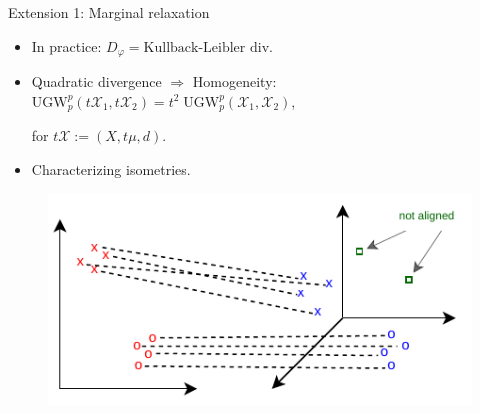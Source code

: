 \documentclass{beamer}
\newcommand{\ugw}{\text{UGW}}
\newcommand{\cX}{\mathcal X}
\begin{document}
\begin{frame}{Extension 1: Marginal relaxation}
  \begin{minipage}[t]{0.6\linewidth}
  \begin{itemize}
    \item In practice: $D_{\varphi} = \text{Kullback-Leibler div}$.
    \item Quadratic divergence $\Rightarrow$ Homogeneity:
    $\ugw_p^p(t\cX_1, t \cX_2) = t^2 \; \ugw_p^p(\cX_1, \cX_2)$,

    for $t \cX := (X, t\mu, d)$.
    \item Characterizing isometries.
  \end{itemize}
  \end{minipage}%
  \hfill%
  \hspace{-6cm}
  \begin{minipage}[t]{0.5\linewidth}
    \vspace{-0.cm}
  \begin{figure}
    \centering
    \includegraphics[width=1.1\linewidth, keepaspectratio=true]{OT_new/ugw.pdf}
  \end{figure}
  \end{minipage}

\end{frame}
\end{document}
